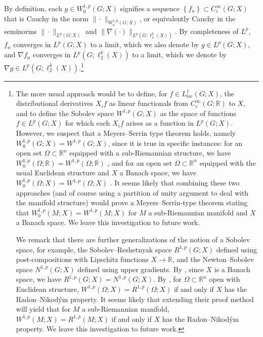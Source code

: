 \documentclass[11pt,reqno]{amsart}
\newcommand{\1}{\mathbf 1}
\begin{document}
By definition, each $g\in W_0^{1,p}\left(G;X\right)$ signifies a sequence $\left\{f_n\right\}\subset C_c^\infty\left(G;X\right)$ that is Cauchy in the norm $\|\cdot\|_{W_0^{1,p}\left(G;X\right)}$, or equivalently Cauchy in the seminorms $\|\cdot\|_{L^{p}\left(G;X\right)}$ and $\|\nabla\left( \cdot\right)\|_{L^{p}\left(G;\ell_2^k\left(X\right)\right)}$. By completeness of $L^p$, $f_n$ converges in $L^{p}\left(G;X\right)$ to a limit, which we also denote by $g\in L^{p}\left(G;X\right)$, and $\nabla f_n$ converges in $L^{p}\left(G;\ell_2^k\left(X\right)\right)$ to a limit, which we denote by $\nabla g\in L^{p}\left(G;\ell_2^k\left(X\right)\right)$.\footnote{The more usual approach would be to define, for $f\in L^1_{\mathrm{loc}}\left(G;X\right)$, the distributional derivatives $X_if$ as linear functionals from $C_c^\infty\left(G;\mathbb{R}\right)$ to $X$, and to define the Sobolev space $W^{1,p}\left(G;X\right)$ as the space of functions $f\in L^{p}\left(G;X\right)$ for which each $X_if$ arises as a function in $L^{p}\left(G;X\right)$. However, we suspect that a Meyers--Serrin type theorem holds, namely $W_0^{1,p}\left(G;X\right)=W^{1,p}\left(G;X\right)$, since it is true in specific instances: for an open set $\Omega\subset \mathbb{R}^n$ equipped with a sub-Riemannian structure, we have $W^{1,p}_0\left(\Omega;\mathbb{R}\right)=W^{1,p}\left(\Omega;\mathbb{R}\right)$  \cite[Theorem 11.9]{hajlasz2000sobolev}, and for an open set $\Omega\subset \mathbb{R}^n$ equipped with the usual Euclidean structure and $X$ a Banach space, we have $W_0^{1,p}\left(\Omega;X\right)=W^{1,p}\left(\Omega;X\right)$ \cite[Theorem 4.11]{kreuter2015sobolev}. It seems likely that combining these two approaches (and of course using a partition of unity argument to deal with the manifold structure) would prove a Meyers--Serrin-type theorem stating that $W_0^{1,p}\left(M;X\right)=W^{1,p}\left(M;X\right)$ for $M$ a sub-Riemannian manifold and $X$ a Banach space. We leave this investigation to future work.

We remark that there are further generalizations of the notion of a Sobolev space, for example, the Sobolev--Reshetnyak space $R^{1,p}\left(G;X\right)$ \cite{reshetnyak1997sobolev} defined using post-compositions with Lipschitz functions $X\to \mathbb{R}$, and the Newton--Sobolev space $N^{1,p}\left(G;X\right)$ \cite[Chapter 7.1]{heinonen2015sobolev} defined using upper gradients. By \cite[Theorem 7.1.20]{heinonen2015sobolev}, since $X$ is a Banach space, we have $R^{1,p}\left(G;X\right)=N^{1,p}\left(G;X\right)$. By \cite[Theorem 4.6]{caamano2021sobolev}, for $\Omega\subset \mathbb{R}^n$ open with Euclidean structure, $W^{1,p}\left(\Omega;X\right)=R^{1,p}\left(\Omega;X\right)$ if and only if $X$ has the Radon--Nikod\'ym property. It seems likely that extending their proof method will yield that for $M$ a sub-Riemannian manifold, $W^{1,p}\left(M;X\right)=R^{1,p}\left(M;X\right)$ if and only if $X$ has the Radon--Nikod\'ym property. We leave this investigation to future work.\label{foot:meyers-serrin}}
\end{document}
